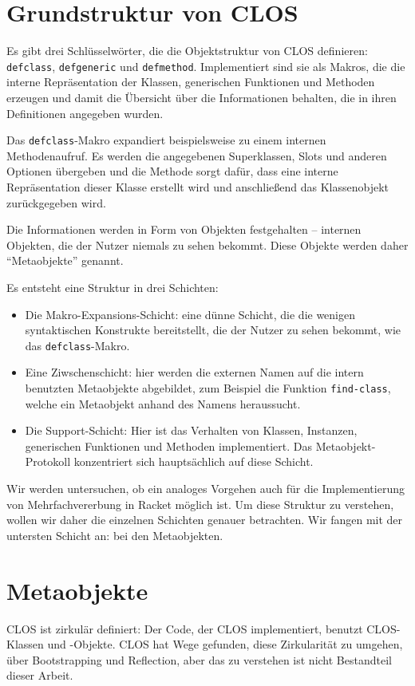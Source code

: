 \section{Grundstruktur von CLOS}
Es gibt drei Schlüsselwörter, die die Objektstruktur von CLOS definieren:  \texttt{defclass}, \texttt{defgeneric} und \texttt{defmethod}. Implementiert sind sie als Makros, die die interne Repräsentation der Klassen, generischen Funktionen und Methoden erzeugen und damit die Übersicht über die Informationen behalten, die in ihren Definitionen angegeben wurden.

Das \texttt{defclass}-Makro expandiert beispielsweise zu einem internen Methodenaufruf. Es werden die angegebenen Superklassen, Slots und anderen Optionen übergeben und die Methode sorgt dafür, dass eine interne Repräsentation dieser Klasse erstellt wird und anschließend das Klassenobjekt zurückgegeben wird.

Die Informationen werden in Form von Objekten festgehalten -- internen Objekten, die der Nutzer niemals zu sehen bekommt. Diese Objekte werden daher ``Metaobjekte'' genannt.

Es entsteht eine Struktur in drei Schichten:
\begin{itemize}
 \item Die Makro-Expansions-Schicht: eine dünne Schicht, die die wenigen syntaktischen Konstrukte bereitstellt, die der Nutzer zu sehen bekommt, wie das \texttt{defclass}-Makro.
 \item Eine Ziwschenschicht: hier werden die externen Namen auf die intern benutzten Metaobjekte abgebildet, zum Beispiel die Funktion \texttt{find-class}, welche ein Metaobjekt anhand des Namens heraussucht.
 \item Die Support-Schicht: Hier ist das Verhalten von Klassen, Instanzen, generischen Funktionen und Methoden implementiert. Das Metaobjekt-Protokoll konzentriert sich hauptsächlich auf diese Schicht.
\end{itemize}

Wir werden untersuchen, ob ein analoges Vorgehen auch für die Implementierung von Mehrfachvererbung in Racket möglich ist. Um diese Struktur zu verstehen, wollen wir daher die einzelnen Schichten genauer betrachten. Wir fangen mit der untersten Schicht an: bei den Metaobjekten.

\section{Metaobjekte}
CLOS ist zirkulär definiert: Der Code, der CLOS implementiert, benutzt CLOS-Klassen und -Objekte. CLOS hat Wege gefunden, diese Zirkularität zu umgehen, über Bootstrapping und Reflection, aber das zu verstehen ist nicht Bestandteil dieser Arbeit. 


